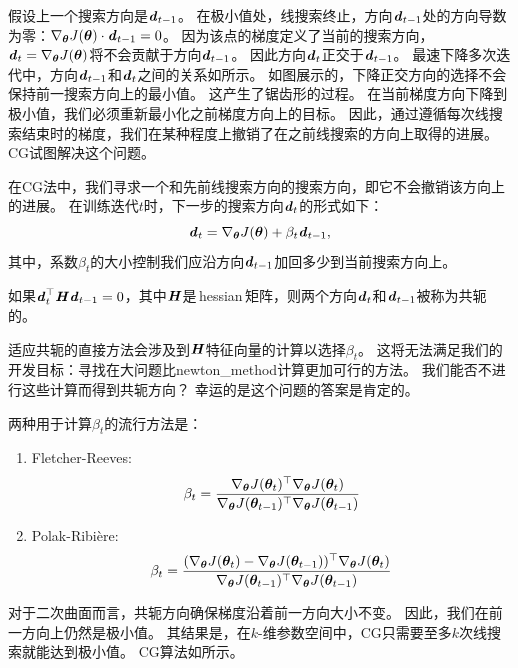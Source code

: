 
假设上一个搜索方向是$\boldsymbol{\mathit{d}}_{t-1}$。   
在极小值处，线搜索终止，方向$\boldsymbol{\mathit{d}}_{t-1}$处的方向导数为零：$\nabla_{\boldsymbol{\theta}} J(\boldsymbol{\theta}) \cdot \boldsymbol{\mathit{d}}_{t-1} = 0$。
因为该点的梯度定义了当前的搜索方向，$\boldsymbol{\mathit{d}}_t = \nabla_{\boldsymbol{\theta}} J(\boldsymbol{\theta})$将不会贡献于方向$\boldsymbol{\mathit{d}}_{t-1}$。
因此方向$\boldsymbol{\mathit{d}}_t$正交于$\boldsymbol{\mathit{d}}_{t-1}$。
最速下降多次迭代中，方向$\boldsymbol{\mathit{d}}_{t-1}$和$\boldsymbol{\mathit{d}}_t$之间的关系如所示。
如图展示的，下降正交方向的选择不会保持前一搜索方向上的最小值。
这产生了锯齿形的过程。
在当前梯度方向下降到极小值，我们必须重新最小化之前梯度方向上的目标。
因此，通过遵循每次线搜索结束时的梯度，我们在某种程度上撤销了在之前线搜索的方向上取得的进展。
\gls{CG}试图解决这个问题。

在\gls{CG}法中，我们寻求一个和先前线搜索方向的搜索方向，即它不会撤销该方向上的进展。
在训练迭代$t$时，下一步的搜索方向$\boldsymbol{\mathit{d}}_t$的形式如下：
\begin{equation}
    \boldsymbol{\mathit{d}}_t = \nabla_{\boldsymbol{\theta}} J(\boldsymbol{\theta}) + \beta_t \boldsymbol{\mathit{d}}_{t-1},
\end{equation}
其中，系数$\beta_t$的大小控制我们应沿方向$\boldsymbol{\mathit{d}}_{t-1}$加回多少到当前搜索方向上。


如果$\boldsymbol{\mathit{d}}_t^\top \boldsymbol{\mathit{H}} \boldsymbol{\mathit{d}}_{t-1} = 0$，其中$\boldsymbol{\mathit{H}}$是\,\gls{hessian}\,矩阵，则两个方向$\boldsymbol{\mathit{d}}_t$和$\boldsymbol{\mathit{d}}_{t-1}$被称为共轭的。

适应共轭的直接方法会涉及到$\boldsymbol{\mathit{H}}$特征向量的计算以选择$\beta_t$。
这将无法满足我们的开发目标：寻找在大问题比\gls{newton_method}计算更加可行的方法。
我们能否不进行这些计算而得到共轭方向？
幸运的是这个问题的答案是肯定的。

两种用于计算$\beta_t$的流行方法是：
\begin{enumerate}
\item Fletcher-Reeves:
\begin{equation}
    \beta_t = \frac{ \nabla_{\boldsymbol{\theta}} J(\boldsymbol{\theta}_t)^\top \nabla_{\boldsymbol{\theta}} J(\boldsymbol{\theta}_t) }
{ \nabla_{\boldsymbol{\theta}} J(\boldsymbol{\theta}_{t-1})^\top \nabla_{\boldsymbol{\theta}} J(\boldsymbol{\theta}_{t-1}) }
\end{equation}

\item Polak-Ribi\`{e}re:
\begin{equation}
    \beta_t = \frac{ (\nabla_{\boldsymbol{\theta}} J(\boldsymbol{\theta}_t) - \nabla_{\boldsymbol{\theta}} J(\boldsymbol{\theta}_{t-1}))^\top \nabla_{\boldsymbol{\theta}} J(\boldsymbol{\theta}_t) }
{ \nabla_{\boldsymbol{\theta}} J(\boldsymbol{\theta}_{t-1})^\top \nabla_{\boldsymbol{\theta}} J(\boldsymbol{\theta}_{t-1}) }
\end{equation}
\end{enumerate}
对于二次曲面而言，共轭方向确保梯度沿着前一方向大小不变。
因此，我们在前一方向上仍然是极小值。
其结果是，在$k$-维参数空间中，\gls{CG}只需要至多$k$次线搜索就能达到极小值。
\gls{CG}算法如所示。

